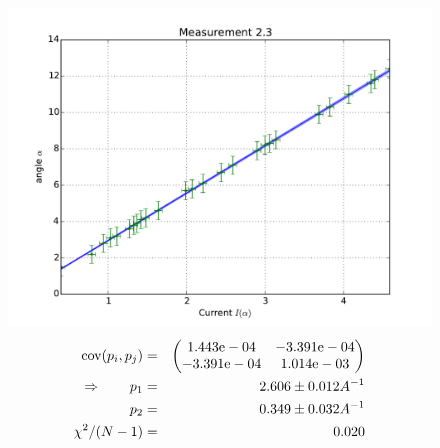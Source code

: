 \begin{figure}
    \begin{centering}
        \includegraphics[width=18cm]{figures/fig23}
\captionsetup{singlelinecheck=off} 
\caption[.]{
\begin{eqnarray}
    \mathrm{cov}(p_i, p_j) &=& 
    \begin{pmatrix}
        1.443\mathrm{e}-04 &-3.391\mathrm{e}-04 \\
        -3.391\mathrm{e}-04 &1.014\mathrm{e}-03 \\
    \end{pmatrix}
\\ \Rightarrow \qquad
    p_1 &=& 2.606 \pm 0.012 A^{-1}\\
    p_2 &=& 0.349 \pm 0.032 A^{-1} \\
    \chi ^2/(N-1) &=&  0.020
\end{eqnarray}
}
    \end{centering}
\end{figure}

